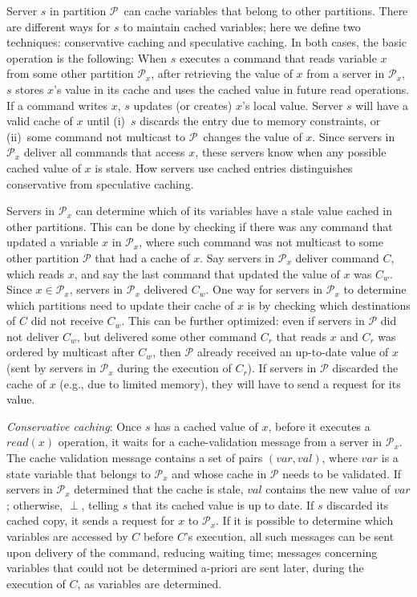 \documentclass[11pt]{article}
\newcommand{\pp}{$\mathcal{P}$}
\newcommand{\ppm}{\mathcal{P}}
\begin{document}
Server $s$ in partition \pp\ can cache variables that belong to other partitions. 
There are different ways for $s$ to maintain cached variables; here we define two techniques: conservative caching and speculative caching. 
In both cases, the basic operation is the following: 
When $s$ executes a command that reads variable $x$ from some other partition $\ppm{}_x$, after retrieving the value of $x$ from a server in $\ppm{}_x$, $s$ stores $x$'s value in its cache and uses the cached value in future read operations.
If a command writes $x$, $s$ updates (or creates) $x$'s local value. 
Server $s$ will have a valid cache of $x$ until (i)~$s$ discards the entry due to memory constraints, or (ii)~some command not multicast to \pp\ changes the value of $x$. 
Since servers in $\ppm_x$ deliver all commands that access $x$, these servers know when any possible cached value of $x$ is stale.
How servers use cached entries distinguishes conservative from speculative caching.


Servers in $\ppm_x$ can determine which of its variables have a stale value cached in other partitions. This can be done by checking if there was any command that updated a variable $x$ in $\ppm_x$, where such command was not multicast to some other partition $\ppm$ that had a cache of $x$. Say servers in $\ppm_x$ deliver command $C$, which reads $x$, and say the last command that updated the value of $x$ was $C_w$. Since $x \in \ppm_x$, servers in $\ppm_x$ delivered $C_w$. One way for servers in $\ppm_x$ to determine which partitions need to update their cache of $x$ is by checking which destinations of $C$ did not receive $C_w$. This can be further optimized: even if servers in $\ppm$ did not deliver $C_w$, but delivered some other command $C_r$ that reads $x$ and $C_r$ was ordered by multicast after $C_w$, then $\ppm$ already received an up-to-date value of $x$ (sent by servers in $\ppm_x$ during the execution of $C_r$). If servers in $\ppm$ discarded the cache of $x$ (e.g., due to limited memory), they will have to send a request for its value.


\emph{Conservative caching}: Once $s$ has a cached value of $x$, before it executes a $read(x)$ operation, it waits for a cache-validation message from a server in $\ppm_x$. The cache validation message contains a set of pairs $(var, val)$, where $var$ is a state variable that belongs to $\ppm_x$ and whose cache in $\ppm$ needs to be validated. 
If servers in $\ppm_x$ determined that the cache is stale, $val$ contains the new value of $var$; otherwise, $\perp$, telling $s$ that its cached value is up to date.
If $s$ discarded its cached copy, it sends a request for $x$ to $\ppm_x$.
If it is possible to determine which variables are accessed by $C$ before $C$'s execution, all such messages can be sent upon delivery of the command, reducing waiting time; messages concerning variables that could not be determined a-priori are sent later, during the execution of $C$, as variables are determined.
\end{document}
